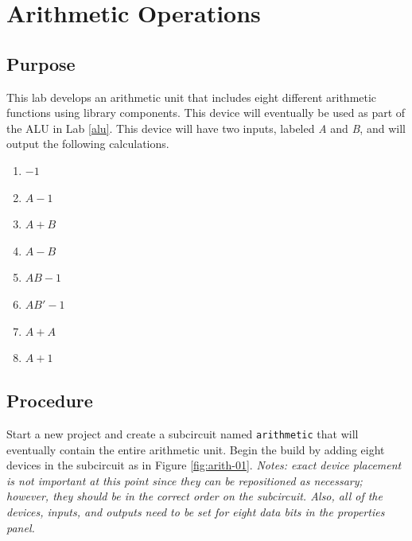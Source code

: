 \chapter{Arithmetic Operations}\label{arith}

\section{Purpose}

This lab develops an arithmetic unit that includes eight different arithmetic functions using \LE library components. This device will eventually be used as part of the \acf{ALU} in Lab \ref{alu}. This device will have two inputs, labeled \textit{A} and \textit{B}, and will output the following calculations.

\begin{enumerate}
	\item $ -1 $
	\item $ A-1 $
	\item $ A+B $
	\item $ A-B $
	\item $ AB-1 $
	\item $ AB'-1 $
	\item $ A+A $
	\item $ A+1 $
\end{enumerate}

\section{Procedure}

Start a new \LE project and create a subcircuit named \lstinline[columns=fixed]|arithmetic| that will eventually contain the entire arithmetic unit. Begin the build by adding eight devices in the subcircuit as in Figure \ref{fig:arith-01}. \textit{Notes: exact device placement is not important at this point since they can be repositioned as necessary; however, they should be in the correct order on the subcircuit. Also, all of the devices, inputs, and outputs need to be set for eight data bits in the properties panel.} 


